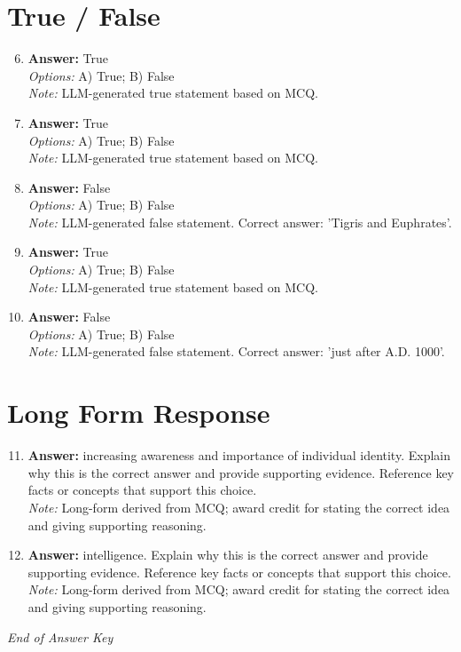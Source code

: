\documentclass[12pt]{article}
\begin{document}
\section*{True / False}
\begin{enumerate}[label=\arabic*.]
\setcounter{enumi}{5}
\item \textbf{Answer:} True
\\ \textit{Options:} A) True; B) False
\\ \textit{Note:} LLM-generated true statement based on MCQ.
\item \textbf{Answer:} True
\\ \textit{Options:} A) True; B) False
\\ \textit{Note:} LLM-generated true statement based on MCQ.
\item \textbf{Answer:} False
\\ \textit{Options:} A) True; B) False
\\ \textit{Note:} LLM-generated false statement. Correct answer: 'Tigris and Euphrates'.
\item \textbf{Answer:} True
\\ \textit{Options:} A) True; B) False
\\ \textit{Note:} LLM-generated true statement based on MCQ.
\item \textbf{Answer:} False
\\ \textit{Options:} A) True; B) False
\\ \textit{Note:} LLM-generated false statement. Correct answer: 'just after A.D. 1000'.
\end{enumerate}

\section*{Long Form Response}
\begin{enumerate}[label=\arabic*.]
\setcounter{enumi}{10}
\item \textbf{Answer:} increasing awareness and importance of individual identity. Explain why this is the correct answer and provide supporting evidence. Reference key facts or concepts that support this choice.
\\ \textit{Note:} Long-form derived from MCQ; award credit for stating the correct idea and giving supporting reasoning.
\item \textbf{Answer:} intelligence. Explain why this is the correct answer and provide supporting evidence. Reference key facts or concepts that support this choice.
\\ \textit{Note:} Long-form derived from MCQ; award credit for stating the correct idea and giving supporting reasoning.
\end{enumerate}

\vfill
\noindent\textit{End of Answer Key}
\end{document}
